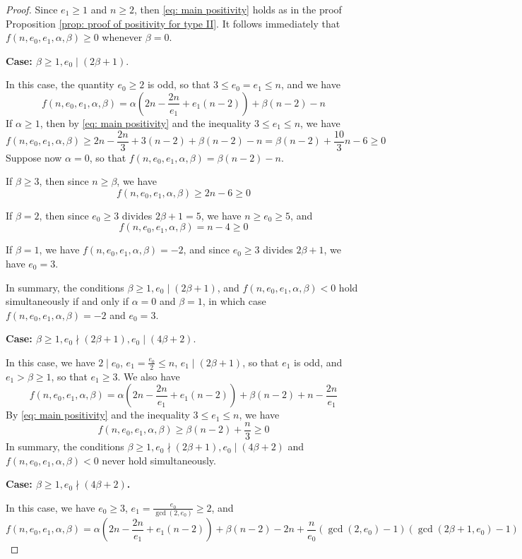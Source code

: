 \documentclass[12pt]{amsart}
\numberwithin{equation}{section}
\theoremstyle{definition}
\begin{document}
\begin{proof}
    Since $e_1\geq 1$ and $n\geq 2$, then \eqref{eq: main positivity} holds as in the proof Proposition \ref{prop: proof of positivity for type II}. It follows immediately that $f(n,e_0,e_1,\alpha,\beta)\geq0$ whenever $\beta=0$. 
    
    \textbf{Case: $\beta\geq 1,e_0\mid(2\beta+1)$}.
    
    In this case, the quantity $e_0\geq 2$ is odd, so that $3\leq e_0=e_1\leq n$, and we have
    \[f(n,e_0,e_1,\alpha,\beta)=\alpha(2n-\frac{2n}{e_1}+e_1(n-2))+\beta(n-2)-n\]
    If $\alpha\geq 1$, then by \eqref{eq: main positivity} and the inequality $3\leq e_1\leq n$, we have
    \[f(n,e_0,e_1,\alpha,\beta)
        \geq 2n-\frac{2n}{3}+3(n-2)+\beta(n-2)-n= \beta(n-2)+\frac{10}{3}n-6
        \geq 0\]
    Suppose now $\alpha=0$, so that $f(n,e_0,e_1,\alpha,\beta)=\beta(n-2)-n$.
    
    If $\beta\geq 3$, then since $n\geq\beta$, we have \[f(n,e_0,e_1,\alpha,\beta)\geq2n-6\geq 0\]
    
    If $\beta=2$, then since $e_0\geq 3$ divides $2\beta+1=5$, we have $n\geq e_0\geq 5$, and \[f(n,e_0,e_1,\alpha,\beta)=n-4\geq0\]
    
    If $\beta=1$, we have $f(n,e_0,e_1,\alpha,\beta)=-2$, and since $e_0\geq 3$ divides $2\beta+1$, we have $e_0=3$.

    In summary, the conditions $\beta\geq 1,e_0\mid (2\beta+1)$, and $f(n,e_0,e_1,\alpha,\beta)<0$ hold simultaneously if and only if $\alpha=0$ and $\beta=1$, in which case $f(n,e_0,e_1,\alpha,\beta)=-2$ and $e_0=3$.
    
    \textbf{Case: $\beta\geq1,e_0\nmid (2\beta+1),e_0\mid (4\beta+2)$}.
     
    In this case, we have $2\mid e_0$, $e_1=\frac{e_0}{2}\leq n$, $e_1\mid(2\beta+1)$, so that $e_1$ is odd, and $e_1>\beta\geq1$, so that $e_1\geq 3$. We also have
    \[f(n,e_0,e_1,\alpha,\beta)=\alpha(2n-\frac{2n}{e_1}+e_1(n-2))+\beta(n-2)+n-\frac{2n}{e_1}\]
    By \eqref{eq: main positivity} and the inequality $3\leq e_1\leq n$, we have
    \[f(n,e_0,e_1,\alpha,\beta)\geq\beta(n-2)+\frac{n}{3}\geq0\]
    In summary, the conditions $\beta\geq1,e_0\nmid (2\beta+1),e_0\mid (4\beta+2)$ and $f(n,e_0,e_1,\alpha,\beta)<0$ never hold simultaneously.
    
    \textbf{Case: $\beta\geq1,e_0\nmid (4\beta+2)$.}
    
    In this case, we have $e_0\geq 3$, $e_1=\frac{e_0}{\gcd(2,e_0)}\geq 2$, and 
    \[f(n,e_0,e_1,\alpha,\beta)=\alpha(2n-\frac{2n}{e_1}+e_1(n-2))+\beta(n-2)-2n+\frac{n}{e_0}(\gcd(2,e_0)-1)(\gcd(2\beta+1,e_0)-1)\]
    

\end{proof}
\end{document}

